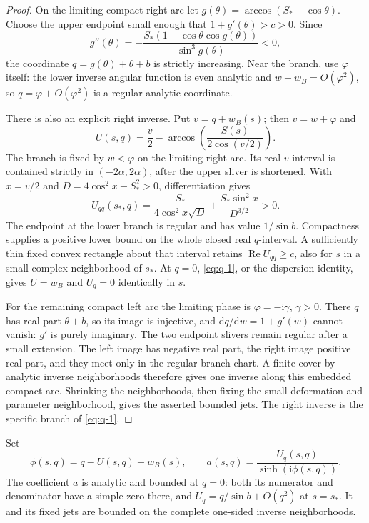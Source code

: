 \documentclass[11pt]{article}
\numberwithin{equation}{section}
\theoremstyle{remark}\newtheorem{remark}[theorem]{Remark}
\newcommand{\ii}{\mathrm i}
\newcommand{\dd}{\mathrm d}
\newcommand{\Rea}{\operatorname{Re}}
\begin{document}
\begin{proof}
On the limiting compact right arc let
$g(\theta)=\arccos(S_*-\cos\theta)$. Choose the upper endpoint small
enough that $1+g'(\theta)>c>0$. Since
\[
 g''(\theta)=-\frac{S_*(1-\cos\theta\cos g(\theta))}{\sin^3g(\theta)}<0,
\]
the coordinate $q=g(\theta)+\theta+b$ is strictly increasing. Near the
branch, use $\varphi$ itself: the lower inverse angular function is
even analytic and $w-w_B=O(\varphi^2)$, so
$q=\varphi+O(\varphi^2)$ is a regular analytic coordinate.

There is also an explicit right inverse. Put $v=q+w_B(s)$; then
$v=w+\varphi$ and
\begin{equation}\label{eq:q-1}
U(s,q)=\frac v2-
 \arccos\left(\frac{S(s)}{2\cos(v/2)}\right).
\end{equation}
The branch is fixed by $w<\varphi$ on the limiting right arc. Its real
$v$-interval is contained strictly in $(-2\alpha,2\alpha)$, after the
upper sliver is shortened. With $x=v/2$ and
$D=4\cos^2x-S_*^2>0$, differentiation gives
\begin{equation}\label{eq:q-2}
U_{qq}(s_*,q)=\frac{S_*}{4\cos^2x\sqrt D}
                  +\frac{S_*\sin^2x}{D^{3/2}}>0.
\end{equation}
The endpoint at the lower branch is regular and has value
$1/\sin b$. Compactness supplies a positive lower bound on the whole
closed real $q$-interval. A sufficiently thin fixed convex rectangle
about that interval retains $\Rea U_{qq}\ge c$, also for $s$ in a
small complex neighborhood of $s_*$. At $q=0$, \eqref{eq:q-1}, or the dispersion
identity, gives $U=w_B$ and $U_q=0$ identically in $s$.

For the remaining compact left arc the limiting phase is
$\varphi=-\ii\gamma$, $\gamma>0$. There $q$ has real part
$\theta+b$, so its image is injective, and
$\dd q/\dd w=1+g'(w)$ cannot vanish: $g'$ is purely imaginary.
The two endpoint slivers remain regular after a small extension. The
left image has negative real part, the right image positive real part,
and they meet only in the regular branch chart. A finite cover by
analytic inverse neighborhoods therefore gives one inverse along this
embedded compact arc. Shrinking the neighborhoods, then fixing the
small deformation and parameter neighborhood, gives the asserted
bounded jets. The right inverse is the specific branch of \eqref{eq:q-1}.
\end{proof}

Set
\[
 \phi(s,q)=q-U(s,q)+w_B(s),\qquad
 a(s,q)=\frac{U_q(s,q)}{\sinh(\ii\phi(s,q))}.
\]
The coefficient $a$ is analytic and bounded at $q=0$: both its numerator
and denominator have a simple zero there, and
$U_q=q/\sin b+O(q^2)$ at $s=s_*$. It and its fixed jets are bounded
on the complete one-sided inverse neighborhoods.
\end{document}
